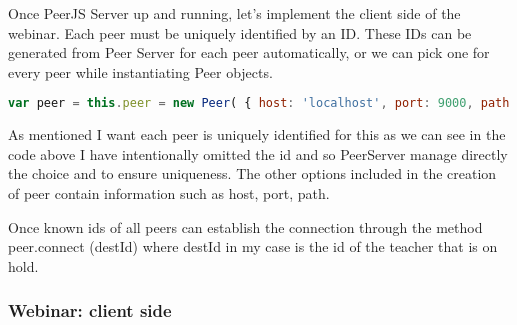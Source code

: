 Once PeerJS Server up and running, let's implement the client side of the webinar. Each peer must be uniquely identified by an ID. These IDs can be generated from Peer Server for each peer automatically, or we can pick one for every peer while instantiating Peer objects.


\begin{lstlisting}[language=javascript]
var peer = this.peer = new Peer( { host: 'localhost', port: 9000, path: '/peerjs'});
\end{lstlisting}

As mentioned I want each peer is uniquely identified for this as we can see in the code above I have intentionally omitted the id and so PeerServer manage directly the choice and to ensure uniqueness.
The other options included in the creation of peer contain information such as host, port, path.


Once known ids of all peers can establish the connection through the method
peer.connect (destId) where destId in my case is the id of the teacher that is on hold.

\subsubsection{Webinar: client side}

